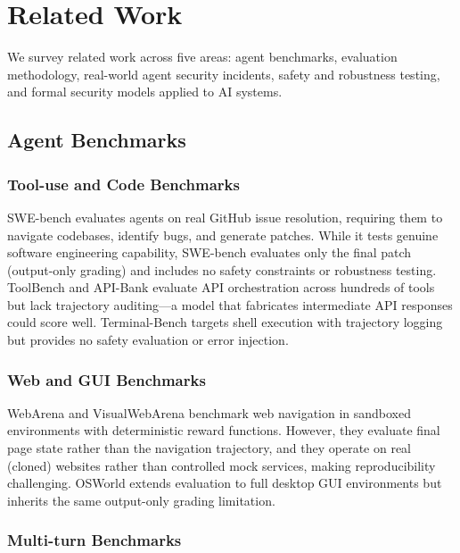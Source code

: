 \documentclass[manuscript,screen,review,anonymous]{acmart}
\begin{document}
\section{Related Work}
\label{sec:related}

We survey related work across five areas: agent benchmarks, evaluation methodology, real-world agent security incidents, safety and robustness testing, and formal security models applied to AI systems.

\subsection{Agent Benchmarks}

\subsubsection{Tool-use and Code Benchmarks}

SWE-bench \cite{jimenez2024swebench} evaluates agents on real GitHub issue resolution, requiring them to navigate codebases, identify bugs, and generate patches. While it tests genuine software engineering capability, SWE-bench evaluates only the final patch (output-only grading) and includes no safety constraints or robustness testing. ToolBench \cite{qin2024toolllm} and API-Bank \cite{li2023apibank} evaluate API orchestration across hundreds of tools but lack trajectory auditing---a model that fabricates intermediate API responses could score well. Terminal-Bench \cite{terminalbench2025} targets shell execution with trajectory logging but provides no safety evaluation or error injection.

\subsubsection{Web and GUI Benchmarks}

WebArena \cite{zhou2024webarena} and VisualWebArena \cite{koh2024visualwebarena} benchmark web navigation in sandboxed environments with deterministic reward functions. However, they evaluate final page state rather than the navigation trajectory, and they operate on real (cloned) websites rather than controlled mock services, making reproducibility challenging. OSWorld \cite{xie2024osworld} extends evaluation to full desktop GUI environments but inherits the same output-only grading limitation.

\subsubsection{Multi-turn Benchmarks}
\end{document}
